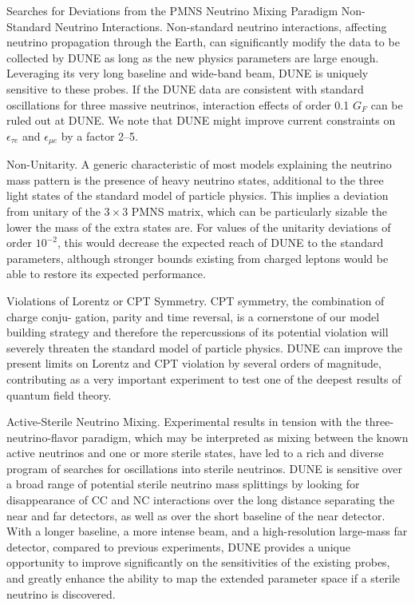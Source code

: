 Searches for Deviations from the PMNS Neutrino Mixing Paradigm
Non-Standard Neutrino Interactions. Non-standard neutrino interactions, affecting neutrino propagation through the Earth, can significantly modify the data to be collected by DUNE as long as the new physics parameters are large enough. Leveraging its very long baseline and wide-band beam, DUNE is uniquely sensitive to these probes. If the DUNE data are consistent with standard oscillations for three massive neutrinos, interaction effects of order 0.1 $G_{F}$ can be ruled out at DUNE. We note that DUNE might improve current constraints on $\epsilon_{\tau e}$ and $\epsilon_{\mu e}$ by a factor 2--5.

Non-Unitarity. A generic characteristic of most models explaining the neutrino mass pattern is the presence of heavy neutrino states, additional to the three light states of the standard model of particle physics. This implies a deviation from unitary of the $3 \times 3$ PMNS matrix, which can be particularly sizable the lower the mass of the extra states are.  For values of the unitarity deviations of order $10^{-2}$, this would decrease the expected reach of DUNE to the standard parameters, although stronger bounds existing from charged leptons would be able to restore its expected performance.

Violations of Lorentz or CPT Symmetry. CPT symmetry, the combination of charge conju- gation, parity and time reversal, is a cornerstone of our model building strategy and therefore the repercussions of its potential violation will severely threaten the standard model of particle physics. DUNE can improve the present limits on Lorentz and CPT violation by several orders of magnitude, contributing as a very important experiment to test one of the deepest results of quantum field theory.

Active-Sterile Neutrino Mixing. Experimental results in tension with the three-neutrino-flavor paradigm, which may be interpreted as mixing between the known active neutrinos and one or more sterile states, have led to a rich and diverse program of searches for oscillations into sterile neutrinos. DUNE is sensitive over a broad range of potential sterile neutrino mass splittings by looking for disappearance of CC and NC interactions over the long distance separating the near and far detectors, as well as over the short baseline of the near detector. With a longer baseline, a more intense beam, and a high-resolution large-mass far detector, compared to previous experiments, DUNE provides a unique opportunity to improve significantly on the sensitivities of the existing probes, and greatly enhance the ability to map the extended parameter space if a sterile neutrino is discovered.

